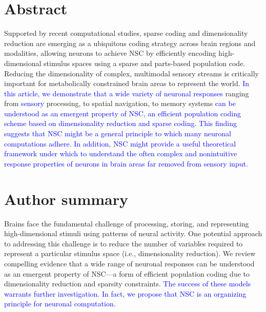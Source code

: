 \documentclass[10pt,letterpaper]{article}
\newcommand{\revise}[1]{\textcolor{blue}{#1}}
\begin{document}
\section*{Abstract}
Supported by recent computational studies, sparse coding and dimensionality reduction are emerging as a ubiquitous coding strategy  across brain regions and modalities, allowing neurons to achieve \acf{NSC} by efficiently encoding high-dimensional stimulus spaces using a sparse and parts-based population code. Reducing the dimensionality of complex, multimodal sensory streams is critically important for metabolically constrained brain areas to represent the world.
\revise{In this article, we demonstrate that a wide variety of neuronal responses}
ranging from \revise{sensory} processing, to spatial navigation, to memory systems
\revise{can be understood as an emergent property of \acf{NSC},
an efficient population coding scheme
based on dimensionality reduction and sparse coding.}
\revise{This finding suggests that \acs{NSC} might be a general principle
to which many neuronal computations adhere.
In addition, \acs{NSC} might provide a useful theoretical framework under which
to understand the often complex and nonintuitive response properties
of neurons in brain areas far removed from sensory input.}



\section*{Author summary}
Brains face the fundamental challenge of processing, storing, and representing high-dimensional stimuli using patterns of neural activity. One potential approach to addressing this challenge is to reduce the number of variables required to represent a particular stimulus space (i.e., dimensionality reduction).
We review compelling evidence that a wide range of neuronal responses can be understood as an emergent property of \acf{NSC}---a form of efficient population coding due to dimensionality reduction and sparsity constraints.
\revise{The success of these models warrants further investigation.
In fact, we propose that \acs{NSC} is an organizing principle for neuronal computation.}

\linenumbers










\nolinenumbers


% 
\end{document}
